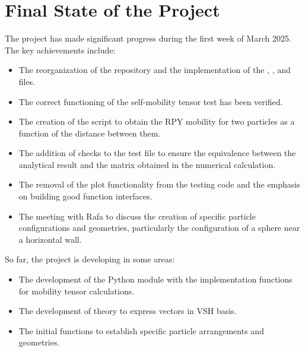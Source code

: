 \documentclass[12pt]{article} %
\begin{document}
\section{Final State of the Project}
The project has made significant progress during the first week of March 2025. The key achievements include:
\begin{itemize}
    \item The reorganization of the repository and the implementation of the , , and  files.
    \item The correct functioning of the self-mobility tensor test has been verified.
    \item The creation of the  script to obtain the RPY mobility for two particles as a function of the distance between them.
    \item The addition of checks to the test file  to ensure the equivalence between the analytical result and the matrix obtained in the numerical calculation.
    \item The removal of the plot functionality from the testing code and the emphasis on building good function interfaces.
    \item The meeting with Rafa to discuss the creation of specific particle configurations and geometries, particularly the configuration of a sphere near a horizontal wall.
\end{itemize}
So far, the project is developing in some areas:
\begin{itemize}
    \item The development of the Python module with the implementation functions for mobility tensor calculations.
    \item The development of theory to express vectors in VSH basis.
    \item The initial functions to establish specific particle arrangements and geometries.
\end{itemize}
\end{document}
